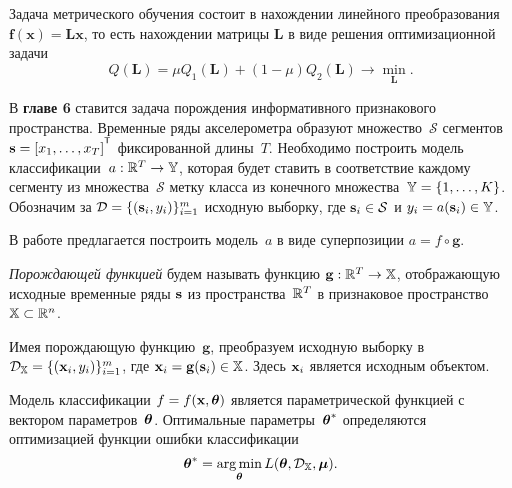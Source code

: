 \documentclass[11pt, a5paper]{dissert}
\begin{document}
Задача метрического обучения состоит в нахождении линейного преобразования $\mathbf{f}(\mathbf{x}) = \mathbf{Lx}$, то есть нахождении матрицы $\mathbf{L}$ в виде решения оптимизационной задачи
\begin{equation}
	\label{ch5:eq:Qmin}
	Q(\mathbf{L}) = \mu Q_1(\mathbf{L}) + (1 - \mu) Q_2(\mathbf{L}) \rightarrow \min_{\mathbf{L}}.
\end{equation}

В \textbf{главе 6} ставится задача порождения информативного признакового пространства.
Временные ряды акселерометра образуют множество~$\mathcal{S}$ сегментов~$\bs = [x_1, \dots, x_T]^{\T}$ фиксированной длины~$T$.
Необходимо построить модель классификации~$a: \mathbb{R}^T \rightarrow \mathbb{Y}$, которая будет ставить в соответствие каждому сегменту из множества~$\mathcal{S}$ метку класса из конечного множества~$\mathbb{Y} = \{1, \dots, K\}$.
Обозначим за $\mathcal{D} = \{(\mathbf{s}_i, y_i)\}_{i=1}^m$ исходную выборку, где $\mathbf{s}_i \in \mathcal{S}$ и $y_i = a(\mathbf{s}_i)\in \mathbb{Y}$.

В работе предлагается построить модель~$a$ в виде суперпозиции $a = f \circ \mathbf{g}$.
\vspace{0.1cm}
\begin{definition}
	\textit{Порождающей функцией} будем называть функцию $\mathbf{g}: \mathbb{R}^T \rightarrow \mathbb{X}$, отображающую исходные временные ряды $\mathbf{s}$ из пространства~$\mathbb{R}^{T} $ в признаковое пространство~$\mathbb{X} \subset \mathbb{R}^n$.
\end{definition}
Имея порождающую функцию~$\mathbf{g}$, преобразуем исходную выборку в $\mathcal{D}_{\mathbb{X}} = \{(\mathbf{x}_i, y_i)\}_{i=1}^m$, где $\mathbf{x}_i = \mathbf{g}(\mathbf{s}_i) \in \mathbb{X}$. Здесь $\mathbf{x}_i$ является исходным объектом.

Модель классификации $f=f(\mathbf{x}, \boldsymbol{\theta})$ является параметрической функцией с вектором параметров~$\boldsymbol{\theta}$. 
Оптимальные параметры~$\boldsymbol{\theta}^*$ определяются оптимизацией функции ошибки классификации
\begin{equation}
	\boldsymbol{\theta}^* = \mathop{\arg \min}\limits_{\boldsymbol{\theta}} L(\boldsymbol{\theta}, \mathcal{D}_{\mathbb{X}}, \boldsymbol{\mu}).
	\label{ch6:eq:optimal_classification_params}
\end{equation}
\end{document}
